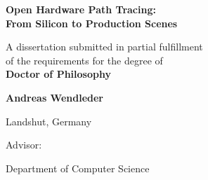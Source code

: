 \begin{titlepage}
\centering
\vspace*{2cm}

{\LARGE\bfseries Open Hardware Path Tracing:\\[0.5em]
From Silicon to Production Scenes\par}

\vspace{2cm}
{\large A dissertation submitted in partial fulfillment\\
of the requirements for the degree of\\[0.5em]
\textbf{Doctor of Philosophy}\par}

\vspace{2cm}
{\large\bfseries Andreas Wendleder\par}

\vspace{1cm}
{\large Landshut, Germany\par}

\vfill

{\large Advisor: \par}
{\large {}\par}
{\large Department of Computer Science\par}

\vspace{1cm}
{\large \the\year\par}
\end{titlepage}
